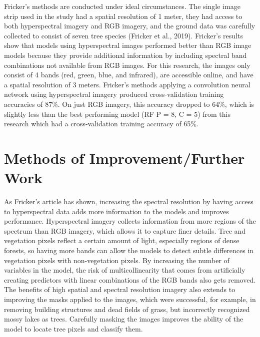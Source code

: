 \documentclass[12pt,twoside]{reedthesis}
\begin{document}
Fricker's methods are conducted under ideal circumstances. The single image strip used in the study had a spatial resolution of 1 meter, they had access to both hyperspectral imagery and RGB imagery, and the ground data was carefully collected to consist of seven tree species (Fricker et al., 2019). Fricker's results show that models using hyperspectral images performed better than RGB image models because they provide additional information by including spectral band combinations not available from RGB images. For this research, the images only consist of 4 bands (red, green, blue, and infrared), are accessible online, and have a spatial resolution of 3 meters. Fricker's methods applying a convolution neural network using hyperspectral imagery produced cross-validation training accuracies of 87\%. On just RGB imagery, this accuracy dropped to 64\%, which is slightly less than the best performing model (RF P = 8, C = 5) from this research which had a cross-validation training accuracy of 65\%.

\hypertarget{methods-of-improvementfurther-work}{%
\section{Methods of Improvement/Further Work}\label{methods-of-improvementfurther-work}}

As Fricker's article has shown, increasing the spectral resolution by having access to hyperspectral data adds more information to the models and improves performance. Hyperspectral imagery collects information from more regions of the spectrum than RGB imagery, which allows it to capture finer details. Tree and vegetation pixels reflect a certain amount of light, especially regions of dense forests, so having more bands can allow the models to detect subtle differences in vegetation pixels with non-vegetation pixels. By increasing the number of variables in the model, the risk of multicollinearity that comes from artificially creating predictors with linear combinations of the RGB bands also gets removed. The benefits of high spatial and spectral resolution imagery also extends to improving the masks applied to the images, which were successful, for example, in removing building structures and dead fields of grass, but incorrectly recognized mossy lakes as trees. Carefully masking the images improves the ability of the model to locate tree pixels and classify them.
\end{document}
